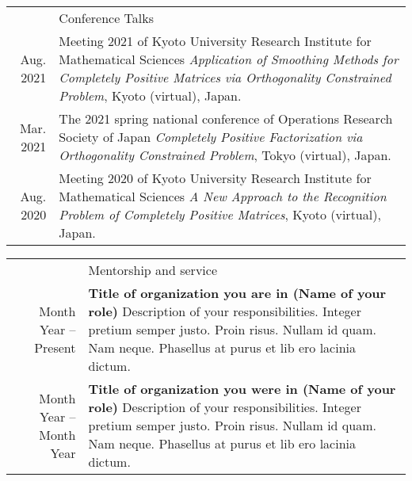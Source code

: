 \documentclass[letterpaper,11pt]{article}
\newcommand{\headingfont}{\Large\color{OliveGreen}}
\newenvironment{SectionTable}[1]{
	\renewcommand*{\arraystretch}{1.7}
	\setlength{\tabcolsep}{10pt}
	\begin{longtable}{Rp{5.2in}} & #1 \\ %
	}
	{
	\end{longtable}\vspace{-.3cm}
}
\begin{document}
\begin{SectionTable}{\headingfont Conference Talks}
	Aug. 2021 & Meeting 2021 of Kyoto University Research Institute for Mathematical Sciences \newline
	\textit{Application of Smoothing Methods for Completely Positive Matrices via Orthogonality Constrained Problem}, Kyoto (virtual), Japan. \\
	
	Mar. 2021 & The 2021 spring national conference of Operations Research Society of Japan \newline
	\textit{Completely Positive Factorization via Orthogonality Constrained Problem}, Tokyo (virtual), Japan. \\
	
	Aug. 2020 & Meeting 2020 of Kyoto University Research Institute for Mathematical Sciences \newline
	\textit{A New Approach to the Recognition Problem of Completely Positive Matrices}, Kyoto (virtual), Japan. \\
	
\end{SectionTable}

%
%



\begin{SectionTable}{\headingfont Mentorship and service}
Month Year -- Present &
\textbf{Title of organization you are in (Name of your role)} \newline
Description of your responsibilities. Integer pretium semper justo. Proin risus. Nullam id quam. Nam neque. Phasellus at purus et lib ero lacinia dictum. \\

Month Year -- Month Year &
\textbf{Title of organization you were in (Name of your role)} \newline
Description of your responsibilities. Integer pretium semper justo. Proin risus. Nullam id quam. Nam neque. Phasellus at purus et lib ero lacinia dictum. \\
\end{SectionTable}
\end{document}
